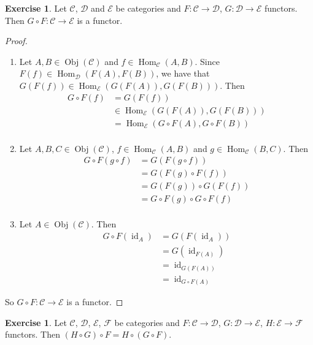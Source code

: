 \documentclass[12pt]{amsart}
\theoremstyle{definition}
\newtheorem{ex}[definition]{Exercise}
\newcommand{\MC}{\mathcal{C}}
\newcommand{\MD}{\mathcal{D}}
\newcommand{\ME}{\mathcal{E}}
\newcommand{\MF}{\mathcal{F}}
\DeclareMathOperator{\id}{id}
\DeclareMathOperator{\Obj}{Obj}
\DeclareMathOperator{\Hom}{Hom}
\DeclareMathOperator*{\0}{\mbf{0}}
\DeclareMathOperator*{\1}{\mbf{1}}
\newcommand{\lex}[1]{\label{ex:#1}}
\begin{document}
	\begin{ex}  \lex{13007}
		Let $\MC$, $\MD$ and $\ME$ be categories and $F:\MC \rightarrow \MD$, $G: \MD \rightarrow \ME$ functors. Then  $G \circ F: \MC \rightarrow \ME$ is a functor.
	\end{ex}

	\begin{proof}\
		\begin{enumerate}
				\item Let $A, B \in \Obj(\MC)$ and $f \in \Hom_{\MC}(A,B)$. Since $F(f) \in \Hom_{\MD}(F(A), F(B))$, we have that $G(F(f)) \in \Hom_{\ME}(G(F(A)), G(F(B)))$. Then 
			\begin{align*}
				G \circ F (f) 
				& = G(F(f)) \\
				& \in \Hom_{\ME}(G(F(A)), G(F(B))) \\
				& =  \Hom_{\ME}(G \circ F(A), G \circ F (B)) \\
			\end{align*}
			\item Let $A,B, C \in \Obj(\MC)$, $f \in \Hom_{\MC}(A,B)$ and $g \in \Hom_{\MC}(B, C)$. Then 
			\begin{align*}
				G \circ F(g \circ f) 
				& = G (F (g \circ f)) \\
				& = G(F(g) \circ F(f)) \\
				& = G(F(g)) \circ G(F(f)) \\
				& = G \circ F (g) \circ G \circ F (f) \\
			\end{align*}
			\item Let $A \in \Obj(\MC)$. Then 
			\begin{align*}
				G \circ F(\id_{A})
				& = G(F(\id_A) )\\
				& = G(\id_{F(A)}) \\
				& = \id_{G(F(A))} \\
				& = \id_{G \circ F(A)} 
			\end{align*}
		\end{enumerate}
		So $G \circ F: \MC \rightarrow \ME$ is a functor. 
	\end{proof}

	\begin{ex}  \lex{13008}
		Let $\MC$, $\MD$, $\ME$, $\MF$ be categories and $F:\MC \rightarrow \MD$, $G : \MD \rightarrow \ME$, $H: \ME \rightarrow \MF$ functors. Then $(H \circ G) \circ F = H \circ (G \circ F)$.
	\end{ex}
\end{document}

